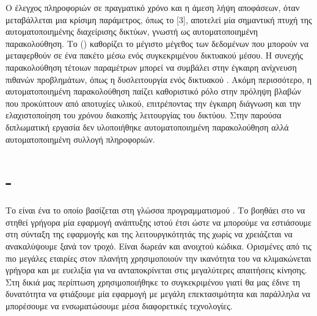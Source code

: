 Ο έλεγχος πληροφοριών σε πραγματικό χρόνο και η άμεση λήψη αποφάσεων, όταν μεταβάλλεται μια κρίσιμη παράμετρος, όπως το [3], αποτελεί μία σημαντική πτυχή της αυτοματοποιημένης διαχείρισης δικτύων, γνωστή ως αυτοματοποιημένη παρακολούθηση.
Το  () καθορίζει το μέγιστο μέγεθος των δεδομένων που μπορούν να μεταφερθούν σε ένα πακέτο μέσω ενός συγκεκριμένου δικτυακού μέσου. Η συνεχής παρακολούθηση τέτοιων παραμέτρων μπορεί να συμβάλει στην έγκαιρη ανίχνευση πιθανών προβλημάτων, όπως η δυσλειτουργία ενός δικτυακού .
Ακόμη περισσότερο, η αυτοματοποιημένη παρακολούθηση παίζει καθοριστικό ρόλο στην πρόληψη βλαβών που προκύπτουν από αποτυχίες υλικού, επιτρέποντας την έγκαιρη διάγνωση και την ελαχιστοποίηση του χρόνου διακοπής λειτουργίας του δικτύου. Στην παρούσα διπλωματική εργασία δεν υλοποιήθηκε αυτοματοποιημένη παρακολούθηση αλλά αυτοματοποιημένη συλλογή πληροφοριών.



\section{- }



Το  είναι ένα  το οποίο βασίζεται στη γλώσσα προγραμματισμού . 
Το  βοηθάει στο να στηθεί γρήγορα μία εφαρμογή ανάπτυξης ιστού έτσι ώστε να μπορούμε να εστιάσουμε στη σύνταξη της εφαρμογής και της λειτουργικότητάς της χωρίς να χρειάζεται να ανακαλύψουμε ξανά τον τροχό.
Είναι δωρεάν και ανοιχτού κώδικα. Ορισμένες από τις πιο μεγάλες εταιρίες στον πλανήτη χρησιμοποιούν την ικανότητα του
να κλιμακώνεται γρήγορα και με ευελιξία για να ανταποκρίνεται στις μεγαλύτερες απαιτήσεις κίνησης. Στη δικιά μας περίπτωση χρησιμοποιήθηκε το συγκεκριμένου
 γιατί θα μας έδινε τη δυνατότητα να φτιάξουμε μία εφαρμογή με μεγάλη επεκτασιμότητα και παράλληλα να μπορέσουμε να ενσωματώσουμε μέσα διαφορετικές τεχνολογίες.


